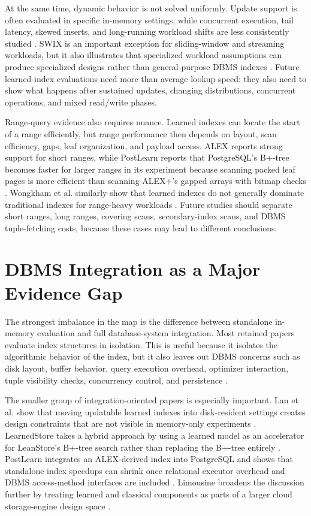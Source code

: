 \documentclass[a4paper, 12pt, twoside]{report}
\begin{document}
At the same time, dynamic behavior is not solved uniformly. Update support is often evaluated in specific in-memory settings, while concurrent execution, tail latency, skewed inserts, and long-running workload shifts are less consistently studied \cite{wongkham2022ready,luo2025robustness}. SWIX is an important exception for sliding-window and streaming workloads, but it also illustrates that specialized workload assumptions can produce specialized designs rather than general-purpose DBMS indexes \cite{liang2024swix}. Future learned-index evaluations need more than average lookup speed: they also need to show what happens after sustained updates, changing distributions, concurrent operations, and mixed read/write phases.

Range-query evidence also requires nuance. Learned indexes can locate the start of a range efficiently, but range performance then depends on layout, scan efficiency, gaps, leaf organization, and payload access. ALEX reports strong support for short ranges, while PostLearn reports that PostgreSQL's B+-tree becomes faster for larger ranges in its experiment because scanning packed leaf pages is more efficient than scanning ALEX+'s gapped arrays with bitmap checks \cite{ding2020alex,fuad2026postlearn}. Wongkham et al. similarly show that learned indexes do not generally dominate traditional indexes for range-heavy workloads \cite{wongkham2022ready}. Future studies should separate short ranges, long ranges, covering scans, secondary-index scans, and DBMS tuple-fetching costs, because these cases may lead to different conclusions.

\section{DBMS Integration as a Major Evidence Gap}

The strongest imbalance in the map is the difference between standalone in-memory evaluation and full database-system integration. Most retained papers evaluate index structures in isolation. This is useful because it isolates the algorithmic behavior of the index, but it also leaves out DBMS concerns such as disk layout, buffer behavior, query execution overhead, optimizer interaction, tuple visibility checks, concurrency control, and persistence \cite{lan2023disk,fuad2026postlearn}.

The smaller group of integration-oriented papers is especially important. Lan et al. show that moving updatable learned indexes into disk-resident settings creates design constraints that are not visible in memory-only experiments \cite{lan2023disk}. LearnedStore takes a hybrid approach by using a learned model as an accelerator for LeanStore's B+-tree search rather than replacing the B+-tree entirely \cite{maharjan2023learnedstore}. PostLearn integrates an ALEX-derived index into PostgreSQL and shows that standalone index speedups can shrink once relational executor overhead and DBMS access-method interfaces are included \cite{fuad2026postlearn}. Limousine broadens the discussion further by treating learned and classical components as parts of a larger cloud storage-engine design space \cite{chatterjee2024limousine}.
\end{document}
